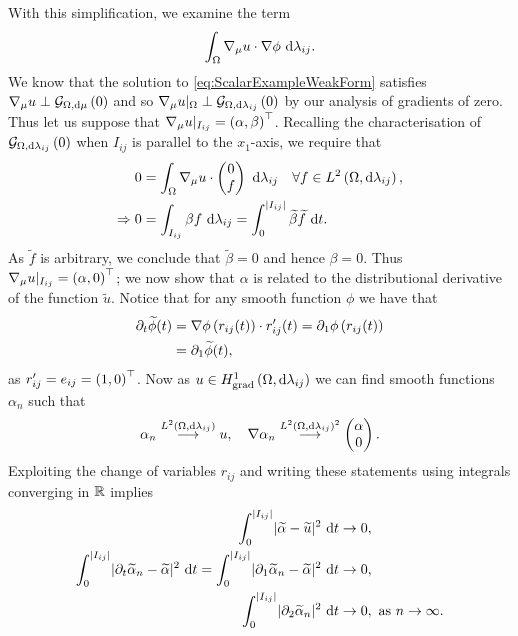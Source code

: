 With this simplification, we examine the term
\begin{align*}
	\int_{\Omega}\nabla_\mu u\cdot\nabla\phi \ \mathrm{d}\lambda_{ij}.
\end{align*}
We know that the solution to \eqref{eq:ScalarExampleWeakForm} satisfies $\nabla_\mu u \perp \mathcal{G}_{ \Omega, \mathrm{d}\mu}\left( 0 \right)$ and so $\nabla_\mu u\vert_{\Omega} \perp \mathcal{G}_{ \Omega, \mathrm{d}\lambda_{ij}}\left( 0 \right)$ by our analysis of gradients of zero.
Thus let us suppose that $\nabla_\mu u\vert_{I_{ij}} = \left( \alpha, \beta \right)^{\top}$.
Recalling the characterisation of $\mathcal{G}_{ \Omega, \mathrm{d}\lambda_{ij}}\left( 0 \right)$ when $I_{ij}$ is parallel to the $x_1$-axis, we require that
\begin{align*}
	0 &= \int_{\Omega}\nabla_\mu u \cdot \begin{pmatrix} 0 \\ f \end{pmatrix} \ \mathrm{d}\lambda_{ij} \quad \forall f\in L^{2}\left( \Omega,\mathrm{d}\lambda_{ij} \right), \\
	\Rightarrow 0 &= \int_{I_{ij}}\beta f \ \mathrm{d}\lambda_{ij}
	= \int_{0}^{\lvert I_{ij} \rvert}\widetilde{\beta}\widetilde{f}\ \mathrm{d} t.
\end{align*}
As $\widetilde{f}$ is arbitrary, we conclude that $\widetilde{\beta}=0$ and hence $\beta=0$.
Thus $\nabla_\mu u\vert_{I_{ij}} = \left( \alpha, 0 \right)^{\top}$; we now show that $\alpha$ is related to the distributional derivative of the function $\widetilde{u}$.
Notice that for any smooth function $\phi$ we have that
\begin{align*}
	\partial_t\widetilde{\phi}(t) &= \nabla\phi\left( r_{ij}(t) \right)\cdot r'_{ij}(t) = \partial_1\phi\left( r_{ij}(t) \right) \\
	&= \partial_1\widetilde{\phi}(t),
\end{align*}
as $r'_{ij}=e_{ij}=\left( 1,0 \right)^{\top}$.
Now as $u\in H^1_\mathrm{grad}\left( \Omega, \mathrm{d}\lambda_{ij} \right)$ we can find smooth functions $\alpha_n$ such that
\begin{align*}
	\alpha_n\overset{L^{2}\left( \Omega,\mathrm{d}\lambda_{ij} \right)}{\longrightarrow}u, \quad \nabla\alpha_n\overset{L^{2}\left( \Omega,\mathrm{d}\lambda_{ij} \right)^2}{\longrightarrow}\begin{pmatrix} \alpha \\ 0	\end{pmatrix}.
\end{align*}
Exploiting the change of variables $r_{ij}$ and writing these statements using integrals converging in $\mathbb{R}$ implies
\begin{align*}
	\int_0^{\lvert I_{ij} \rvert}\lvert \widetilde{\alpha}-\widetilde{u} \rvert^2 \ \mathrm{d} t &\rightarrow 0, \\
	\int_0^{\lvert I_{ij} \rvert}\lvert \partial_t\widetilde{\alpha}_n - \widetilde{\alpha} \rvert^2 \ \mathrm{d} t = \int_0^{\lvert I_{ij} \rvert}\lvert \partial_1\widetilde{\alpha}_n - \widetilde{\alpha} \rvert^2 \ \mathrm{d} t &\rightarrow 0, \\
	\int_0^{\lvert I_{ij} \rvert}\lvert \partial_2\widetilde{\alpha}_n \rvert^2 \ \mathrm{d} t &\rightarrow 0, \ \text{as} \ n \rightarrow\infty.
\end{align*}
